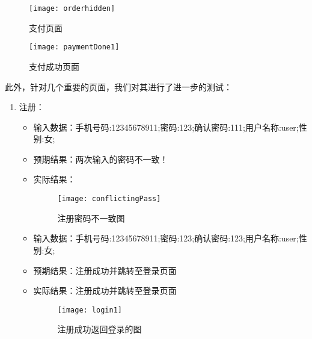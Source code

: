 \begin{figure}[htbp]
    \centering
    \begin{minipage}{0.4\textwidth}
        \centering
        \texttt{[image: orderhidden]}
        \caption{支付页面}\label{fig:part2test5}
    \end{minipage}
    \begin{minipage}{0.4\textwidth}
        \centering
        \texttt{[image: paymentDone1]}
        \caption{支付成功页面}\label{fig:paymentDone1}
    \end{minipage}
\end{figure}
此外，针对几个重要的页面，我们对其进行了进一步的测试：
\begin{enumerate}
    \item{注册}：
    \begin{itemize}
        \item{输入数据}：手机号码:12345678911;密码:123;确认密码:111;用户名称:user;性别:女;
        \item {预期结果}：两次输入的密码不一致！
        \item {实际结果}：
              \begin{figure}[htbp]
                  \centering
                  \texttt{[image: conflictingPass]}
                  \caption{注册密码不一致图}\label{fig:conflictingPass}
              \end{figure}

              \item{输入数据}：手机号码:12345678911;密码:123;确认密码:123;用户名称:user;性别:女;
        \item {预期结果}：注册成功并跳转至登录页面
        \item {实际结果}：注册成功并跳转至登录页面
              \begin{figure}[htbp]
                  \centering
                  \texttt{[image: login1]}
                  \caption{注册成功返回登录的图}\label{fig:login1}
              \end{figure}


\end{itemize}
\end{enumerate}
